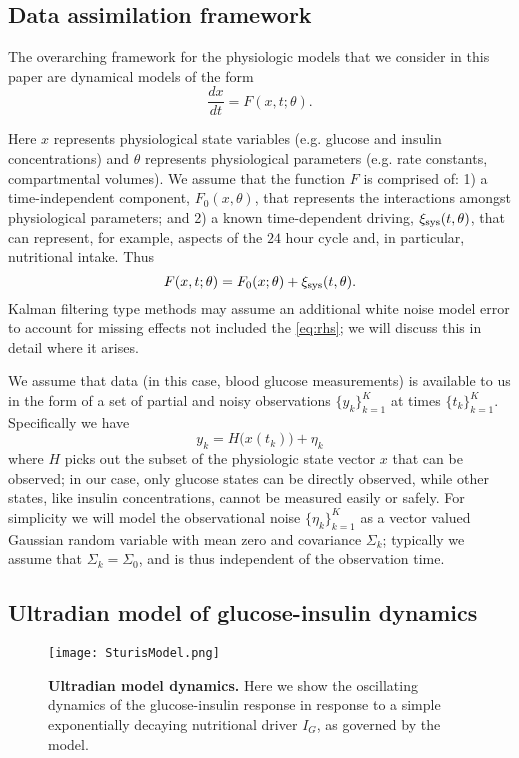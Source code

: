 \documentclass[10pt,letterpaper]{article}
\newcommand{\xin}{\xi_{\rm noise}}
\newcommand{\xis}{\xi_{\rm sys}}
\begin{document}
\subsection{Data assimilation framework}
The overarching framework for the physiologic models that we consider
in this paper are dynamical models of the form
\begin{equation}
\label{eq:modelOverarching}
\frac{dx}{dt}=F(x,t;\theta).
\end{equation}

Here $x$ represents physiological state variables (e.g.
glucose and insulin concentrations) and $\theta$ represents physiological
parameters (e.g. rate constants, compartmental volumes).
We assume that the function $F$ is comprised of: 1) a time-independent component, $F_0(x,\theta)$,
that represents the interactions amongst physiological
parameters; and 2) a known time-dependent driving, $\xis(t,\theta)$, that can represent, for example,
aspects of the $24$ hour cycle and, in particular, nutritional intake. 
Thus
\begin{equation}
\label{eq:rhs}
F(x,t;\theta)=F_0(x;\theta)+\xis(t,\theta).
\end{equation}
Kalman filtering type methods may assume an additional white noise model error
to account for missing effects not included the \eqref{eq:rhs}; we will discuss
this in detail where it arises. 

We assume that data (in this case, blood glucose measurements) is available to us in the form of a set of
partial and noisy observations $\{y_k\}_{k=1}^{K}$ at times $\{t_k\}_{k=1}^K$.
Specifically we have
\begin{equation}
\label{eq:data}
y_k=H\bigl(x(t_k)\bigr)+\eta_k
\end{equation}
where $H$ picks out the subset of the physiologic state vector $x$ that can be observed;
in our case, only glucose states can be directly observed, while other states, like insulin concentrations, cannot be measured easily or safely. 
For simplicity we will model the observational
noise $\{\eta_k\}_{k=1}^{K}$ as a vector valued Gaussian random variable with mean zero and 
covariance $\Sigma_k$; typically we assume that $\Sigma_k=\Sigma_0$,
and is thus independent of the observation time.

\subsection{Ultradian model of glucose-insulin dynamics}
\begin{figure}[!h]
    \centering
    \texttt{[image: SturisModel.png]}
    \caption{{\bf Ultradian model dynamics.} Here we show the oscillating dynamics of the glucose-insulin response in response to a simple exponentially decaying nutritional driver $I_G$, as governed by the model.}
    \label{fig:UltradianModel}
\end{figure}
\end{document}
